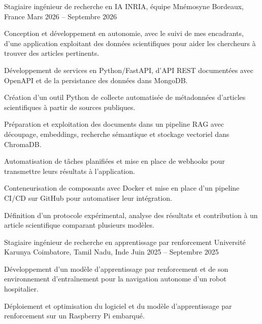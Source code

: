 
\begin{cventries}
  \cventry
    {Stagiaire ingénieur de recherche en IA}
    {INRIA, équipe Mnémosyne}
    {Bordeaux, France}
    {Mars 2026 -- Septembre 2026}
    {
      \begin{cvitems}
        \item {Conception et développement en autonomie, avec le suivi de mes encadrants, d’une application exploitant des données scientifiques pour aider les chercheurs à trouver des articles pertinents.}
        \item {Développement de services en Python/FastAPI, d’API REST documentées avec OpenAPI et de la persistance des données dans MongoDB.}
        \item {Création d’un outil Python de collecte automatisée de métadonnées d’articles scientifiques à partir de sources publiques.}
        \item {Préparation et exploitation des documents dans un pipeline RAG avec découpage, embeddings, recherche sémantique et stockage vectoriel dans ChromaDB.}
        \item {Automatisation de tâches planifiées et mise en place de webhooks pour transmettre leurs résultats à l’application.}
        \item {Conteneurisation de composants avec Docker et mise en place d’un pipeline CI/CD sur GitHub pour automatiser leur intégration.}
        \item {Définition d’un protocole expérimental, analyse des résultats et contribution à un article scientifique comparant plusieurs modèles.}
      \end{cvitems}
    }

  \cventry
    {Stagiaire ingénieur de recherche en apprentissage par renforcement}
    {Université Karunya}
    {Coimbatore, Tamil Nadu, Inde}
    {Juin 2025 -- Septembre 2025}
    {
      \begin{cvitems}
        \item {Développement d’un modèle d’apprentissage par renforcement et de son environnement d’entraînement pour la navigation autonome d’un robot hospitalier.}
        \item {Déploiement et optimisation du logiciel et du modèle d’apprentissage par renforcement sur un Raspberry Pi embarqué.}
      \end{cvitems}
    }
\end{cventries}
